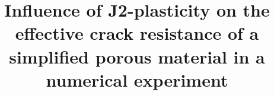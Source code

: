 \documentclass[pdflatex,sn-mathphys-num]{sn-jnl}%
\theoremstyle{thmstyleone}%
\theoremstyle{thmstyletwo}%
\theoremstyle{thmstylethree}%
\begin{document}
\title[Influence of J2-plasticity on the effective crack resistance of a simplified porous material in a numerical experiment]{Influence of J2-plasticity on the effective crack resistance of a simplified porous material in a numerical experiment}


\author*[1]{ }

\author[1]{ }

\author[1]{ }


\end{document}
